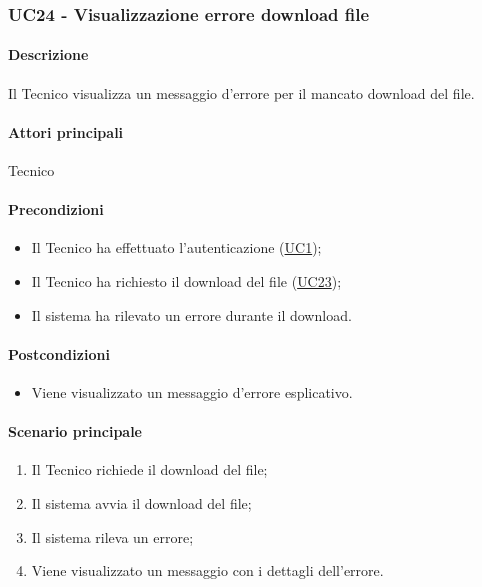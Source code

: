 \subsubsection{UC24 - Visualizzazione errore download file}\label{UC24}
\paragraph*{Descrizione}
Il Tecnico visualizza un messaggio d'errore per il mancato download del file.

\paragraph*{Attori principali}
Tecnico

\paragraph*{Precondizioni}
\begin{itemize}
  \item Il Tecnico ha effettuato l'autenticazione (\hyperref[UC1]{UC1});
  \item Il Tecnico ha richiesto il download del file (\hyperref[UC23]{UC23});
  \item Il sistema ha rilevato un errore durante il download.
\end{itemize}

\paragraph*{Postcondizioni}
\begin{itemize}
  \item Viene visualizzato un messaggio d'errore esplicativo.
\end{itemize}

\paragraph*{Scenario principale}
\begin{enumerate}
  \item Il Tecnico richiede il download del file;
  \item Il sistema avvia il download del file;
  \item Il sistema rileva un errore;
  \item Viene visualizzato un messaggio con i dettagli dell'errore.
\end{enumerate}